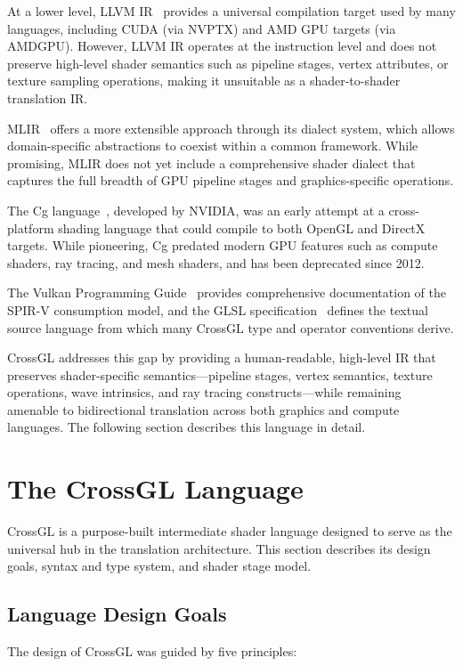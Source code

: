 \documentclass{svproc}
\begin{document}
At a lower level, LLVM IR~\cite{lattner2004llvm} provides a universal compilation target used by many languages, including CUDA (via NVPTX) and AMD GPU targets (via AMDGPU). However, LLVM IR operates at the instruction level and does not preserve high-level shader semantics such as pipeline stages, vertex attributes, or texture sampling operations, making it unsuitable as a shader-to-shader translation IR.

MLIR~\cite{lattner2021mlir} offers a more extensible approach through its dialect system, which allows domain-specific abstractions to coexist within a common framework. While promising, MLIR does not yet include a comprehensive shader dialect that captures the full breadth of GPU pipeline stages and graphics-specific operations.

The Cg language~\cite{mark2003cg}, developed by NVIDIA, was an early attempt at a cross-platform shading language that could compile to both OpenGL and DirectX targets. While pioneering, Cg predated modern GPU features such as compute shaders, ray tracing, and mesh shaders, and has been deprecated since 2012.

The Vulkan Programming Guide~\cite{sellers2017vulkan} provides comprehensive documentation of the SPIR-V consumption model, and the GLSL specification~\cite{kessenich2018glsl} defines the textual source language from which many CrossGL type and operator conventions derive.

CrossGL addresses this gap by providing a human-readable, high-level IR that preserves shader-specific semantics---pipeline stages, vertex semantics, texture operations, wave intrinsics, and ray tracing constructs---while remaining amenable to bidirectional translation across both graphics and compute languages. The following section describes this language in detail.
\section{The CrossGL Language}

CrossGL is a purpose-built intermediate shader language designed to serve as the universal hub in the translation architecture. This section describes its design goals, syntax and type system, and shader stage model.

\subsection{Language Design Goals}

The design of CrossGL was guided by five principles:
\end{document}
